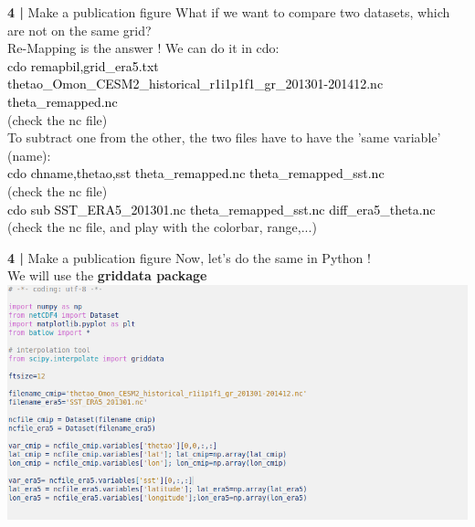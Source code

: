   
 \begin{frame}{\textbf{4 |} Make a publication figure} 
    What if we want to compare two datasets, which are not on the same grid? \\
        \vspace{0.3cm}
    Re-Mapping is the answer !
        \vspace{0.3cm}
    We can do it in cdo: \\
    \textcolor{black}{cdo remapbil,grid\_era5.txt thetao\_Omon\_CESM2\_historical\_r1i1p1f1\_gr\_201301-201412.nc theta\_remapped.nc}\\
    (check the nc file)\\
        \vspace{0.5cm}
    To subtract one from the other, the two files have to have the 'same variable' (name):\\
        \vspace{0.3cm} 
    \textcolor{black}{cdo chname,thetao,sst theta\_remapped.nc theta\_remapped\_sst.nc} \\
    (check the nc file)\\
        \vspace{0.3cm} 
    \textcolor{black}{cdo sub SST\_ERA5\_201301.nc theta\_remapped\_sst.nc diff\_era5\_theta.nc} \\
    (check the nc file, and play with the colorbar, range,...)
\end{frame}

  
\begin{frame}{\textbf{4 |} Make a publication figure} 
    Now, let's do the same in Python !\\
        \vspace{0.5cm} 
    We will use the \textbf{griddata package}\\
    \includegraphics[scale=0.35]{images/Script5_step1.png}
\end{frame}
  

